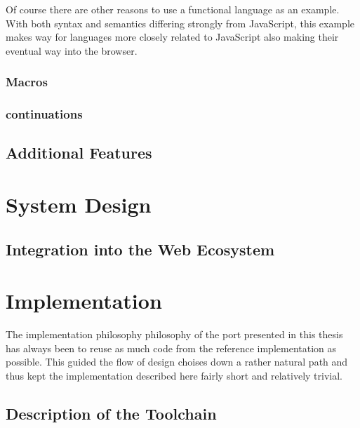 \documentclass[oneside,11pt,xetex]{scrbook}
\begin{document}
Of course there are other reasons to use a functional language as an example. With both syntax
and semantics differing strongly from JavaScript, this example makes way for languages more
closely related to JavaScript also making their eventual way into the browser.

\subsection{Macros}
\label{macro}
\subsection{continuations}
\label{continuation}

\section{Additional Features}


\chapter{System Design}
\label{chap:SystemDesign}

\section{Integration into the Web Ecosystem}


\chapter{Implementation}
\label{chap:Implementation}

The implementation philosophy philosophy of the port presented in this thesis has always been to
reuse as much code from the reference implementation as possible. This guided the flow of design
choises down a rather natural path and thus kept the implementation described here fairly short and
relatively trivial.

\section{Description of the Toolchain}
\end{document}
